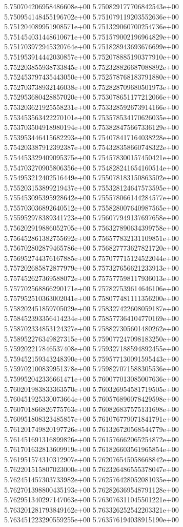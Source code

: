 5.750704206958486608e+00
5.750829177706842543e+00
5.750954148455196702e+00
5.751079119203552636e+00
5.751204089951908571e+00
5.751329060700254736e+00
5.751454031448610671e+00
5.751579002196964829e+00
5.751703972945320764e+00
5.751828943693676699e+00
5.751953914442030857e+00
5.752078885190377910e+00
5.752203855938733845e+00
5.752328826687088892e+00
5.752453797435443050e+00
5.752578768183791880e+00
5.752703738932146038e+00
5.752828709680501973e+00
5.752953680428857020e+00
5.753078651177212066e+00
5.753203621925558231e+00
5.753328592673914166e+00
5.753453563422270101e+00
5.753578534170626035e+00
5.753703504918980194e+00
5.753828475667336129e+00
5.753953446415682293e+00
5.754078417164038228e+00
5.754203387912392387e+00
5.754328358660748322e+00
5.754453329409095375e+00
5.754578300157450421e+00
5.754703270905806356e+00
5.754828241654160514e+00
5.754953212402516449e+00
5.755078183150863502e+00
5.755203153899219437e+00
5.755328124647573595e+00
5.755453095395928642e+00
5.755578066144284577e+00
5.755703036892640512e+00
5.755828007640987565e+00
5.755952978389341723e+00
5.756077949137697658e+00
5.756202919886052705e+00
5.756327890634399758e+00
5.756452861382755692e+00
5.756577832131109851e+00
5.756702802879465786e+00
5.756827773627821720e+00
5.756952744376167885e+00
5.757077715124522044e+00
5.757202685872877979e+00
5.757327656621233913e+00
5.757452627369588072e+00
5.757577598117936013e+00
5.757702568866290171e+00
5.757827539614646106e+00
5.757952510363002041e+00
5.758077481111356200e+00
5.758202451859705029e+00
5.758327422608059187e+00
5.758452393356414234e+00
5.758577364104770169e+00
5.758702334853124327e+00
5.758827305601480262e+00
5.758952276349827315e+00
5.759077247098183250e+00
5.759202217846537408e+00
5.759327188594892455e+00
5.759452159343248390e+00
5.759577130091595443e+00
5.759702100839951378e+00
5.759827071588305536e+00
5.759952042336661471e+00
5.760077013085007636e+00
5.760201983833363570e+00
5.760326954581719505e+00
5.760451925330073664e+00
5.760576896078429598e+00
5.760701866826775763e+00
5.760826837575131698e+00
5.760951808323485857e+00
5.761076779071841791e+00
5.761201749820197726e+00
5.761326720568544779e+00
5.761451691316899826e+00
5.761576662065254872e+00
5.761701632813609919e+00
5.761826603561965854e+00
5.761951574310312907e+00
5.762076545058668842e+00
5.762201515807023000e+00
5.762326486555378047e+00
5.762451457303733982e+00
5.762576428052081035e+00
5.762701398800435193e+00
5.762826369548791128e+00
5.762951340297147063e+00
5.763076311045501221e+00
5.763201281793849162e+00
5.763326252542203321e+00
5.763451223290559255e+00
5.763576194038915190e+00
